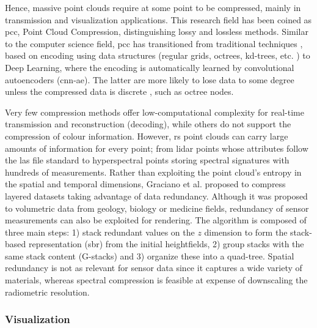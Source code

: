Hence, massive point clouds require at some point to be compressed, mainly in transmission and visualization applications. This research field has been coined as \acrshort{pcc}, Point Cloud Compression, distinguishing lossy and lossless methods. Similar to the computer science field, \acrshort{pcc} has transitioned from traditional techniques \cite{bui_comparative_2021}, based on encoding using data structures (regular grids, octrees, kd-trees, etc. \cite{cao_3d_2019}) to Deep Learning, where the encoding is automatically learned by convolutional autoencoders (\acrshort{cnn-ae}). The latter are more likely to lose data to some degree unless the compressed data is discrete \cite{que_voxelcontext-net_2021}, such as octree nodes. 

Very few compression methods offer low-computational complexity for real-time transmission \cite{cao_3d_2019} and reconstruction (decoding), while others do not support the compression of colour information. However, \acrshort{rs} point clouds can carry large amounts of information for every point; from \acrshort{lidar} points whose attributes follow the \acrshort{las} file standard to hyperspectral points storing spectral signatures with hundreds of measurements. Rather than exploiting the point cloud's entropy in the spatial and temporal dimensions, Graciano et al. \cite{graciano_quadstack_2021} proposed to compress layered datasets taking advantage of data redundancy. Although it was proposed to volumetric data from geology, biology or medicine fields, redundancy of sensor measurements can also be exploited for rendering. The algorithm is composed of three main steps: 1) stack redundant values on the $\textit{z}$ dimension to form the stack-based representation (\acrshort{sbr}) from the initial heightfields, 2) group stacks with the same stack content (G-stacks) and 3) organize these into a quad-tree. Spatial redundancy is not as relevant for sensor data since it captures a wide variety of materials, whereas spectral compression is feasible at expense of downscaling the radiometric resolution. 

\subsubsection{Visualization}

